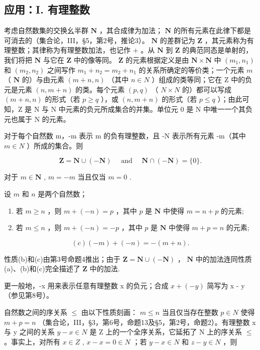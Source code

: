 \subsection{应用：I. 有理整数}

考虑自然数集的交换幺半群 \(\mathbf{N}\) ，其合成律为加法； \(\mathbf{N}\) 的所有元素在此律下都是可消去的（集合论，III，§5，第2号，推论3）。 \(\mathbf{N}\) 的差群记为 \(\mathbf{Z}\) ，其元素称为有理整数；其律称为有理整数加法，也记作 \(+\) 。从 \(\mathbf{N}\) 到 \(\mathbf{Z}\) 的典范同态是单射的，我们将把 \(\mathbf{N}\) 与它在 \(\mathbf{Z}\) 中的像等同。 \(\mathbf{Z}\) 的元素根据定义是由 \(\mathbf{N} \times \mathbf{N}\) 中 \((m_1, n_1)\) 和 \((m_2, n_2)\) 之间写作 \(m_1 + n_2 = m_2 + n_1\) 的关系所确定的等价类；一个元素 \(m\) （ \(\mathbf{N}\) 的）与由元素 \((m + n, n)\) （其中 \(n \in N\) ）组成的类等同；它在 Z 中的负元是元素 \((n, m + n)\) 的类。每个元素 \((p, q)\) （ \(N \times N\) 的）都可以写成 \((m + n, n)\) 的形式（若 \(p \geqslant q\) ），或 \((n, m + n)\) 的形式（若 \(p \leqslant q\) ）；由此可知，Z 是 N 与 N 中元素的负元所成集合的并集。单位元 0 是 N 中唯一一个其负元也属于 N 的元素。

对于每个自然数 m，-m 表示 m 的负有理整数，且 -N 表示所有元素 -m（其中 \(m \in N\) ）所成的集合。则

\[
\mathbf {Z} = \mathbf {N} \cup (- \mathbf {N}) \quad \text { and } \quad \mathbf {N} \cap (- \mathbf {N}) = \{0 \}.
\]

对于 \(m \in \mathbf{N}\) , \(m = -m\) 当且仅当 \(m = 0\) .

设 \(m\) 和 \(n\) 是两个自然数；

\begin{enumerate}
\def\labelenumi{(\alph{enumi})}
\item
  若 \(m \geqslant n\) ，则 \(m + (-n) = p\) ，其中 \(p\) 是 \(\mathbf{N}\) 中使得 \(m = n + p\) 的元素;
\item
  若 \(m \leqslant n\) ，则 \(m + (-n) = -p\) ，其中 \(p\) 是 \(\mathbf{N}\) 中使得 \(m + p = n\) 的元素;
\end{enumerate}

\[
(c) (- m) + (- n) = - (m + n).
\]

性质(b)和(c)由第3号命题4推出；由于 \(\mathbf{Z} = \mathbf{N} \cup (-\mathbf{N})\) ， \(\mathbf{N}\) 中的加法连同性质(a)、(b)和(c)完全描述了 \(\mathbf{Z}\) 中的加法.

更一般地，-x 用来表示任意有理整数 x 的负元；合成 \(x + (-y)\) 简写为 x - y（参见第8号）。

自然数之间的序关系 \(\leqslant\) 由以下性质刻画： \(m \leqslant n\) 当且仅当存在整数 \(p \in N\) 使得 \(m + p = n\) （集合论，III，§3，第6号，命题13及§5，第2号，命题2）。有理整数 x 与 y 之间的关系 \(y - x \in N\) 是 Z 上的一个全序关系，它延拓了 N 上的序关系 \(\leqslant\) 。事实上，对所有 \(x \in Z\) , \(x - x = 0 \in N\) ；若 \(y - x \in N\) 和 \(z - y \in N\) ，则

